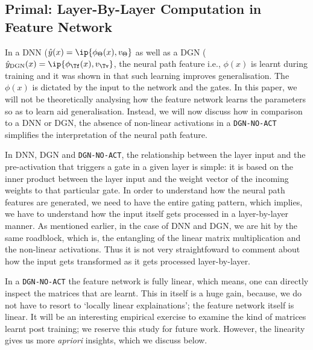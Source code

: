 \subsection{Primal: Layer-By-Layer Computation in Feature Network}\label{sec:primal}
In a DNN ($\hat{y}(x)=\ip{\phi_\Theta(x),v_{\Theta}}$ as well as a DGN ($\hat{y}_{\text{DGN}}(x)=\ip{\phi_\Tf(x),v_{\Tv}}$, the neural path feature i.e., $\phi(x)$ is learnt during training and it was shown in \citep{npk} that such learning improves generalisation. The $\phi(x)$ is dictated by the input to the network and the gates. 
In this paper, we will not be theoretically analysing how the feature network learns the parameters so as to learn aid generalisation. Instead, we will now discuss how in comparison to a DNN or DGN, the absence of non-linear activations in a \texttt{DGN-NO-ACT} simplifies the interpretation of the neural path feature. 

In DNN, DGN and \texttt{DGN-NO-ACT}, the relationship between the layer input and the pre-activation that triggers a gate in a given layer is simple: it is based on the inner product between the layer input and the weight vector of the incoming weights to that particular gate. In order to understand how the neural path features are generated, we need to have the entire gating pattern, which implies, we have to understand how the input itself gets processed in a layer-by-layer manner. As mentioned earlier, in the case of DNN and DGN, we are hit by the same roadblock, which is, the entangling of the linear matrix multiplication and the non-linear activations. Thus it is not very straightfoward to comment about how the input gets transformed as it gets processed layer-by-layer. 


In a \texttt{DGN-NO-ACT} the feature network is fully linear, which means, one can directly inspect the matrices that are learnt. This in itself is a huge gain, because, we do not have to resort to  `locally linear explainations'; the feature network itself is linear. It will be an interesting empirical exercise to examine the kind of matrices learnt post training; we reserve this study for future work. However, the linearity gives us more \emph{apriori} insights, which we discuss below. 

